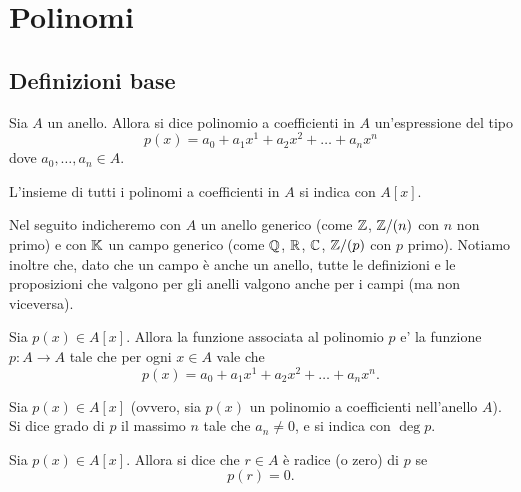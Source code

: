 \chapter{Polinomi}

\section{Definizioni base}

\begin{definition}[Polinomio]
    Sia $A$ un anello. Allora si dice polinomio a coefficienti in $A$ un'espressione del tipo \begin{equation}
        p(x) = a_0 + a_1x^1 + a_2x^2+ \dots + a_nx^n
    \end{equation}
    dove $a_0, \dots, a_n \in A$.

    L'insieme di tutti i polinomi a coefficienti in $A$ si indica con $A[x]$.
\end{definition}

Nel seguito indicheremo con $A$ un anello generico (come $\mathbb{Z}$, $\mathbb{Z}/(n)$ con $n$ non primo) e con $\mathbb{K}$ un campo generico (come $\mathbb{Q}$, $\mathbb{R}$, $\mathbb{C}$, $\mathbb{Z}/(p)$ con $p$ primo). Notiamo inoltre che, dato che un campo è anche un anello, tutte le definizioni e le proposizioni che valgono per gli anelli valgono anche per i campi (ma non viceversa).

\begin{definition}
    Sia $p(x) \in A[x]$. Allora la funzione associata al polinomio $p$ e' la funzione $p : A \to A$ tale che per ogni $x \in A$ vale che \[
        p(x) = a_0 + a_1x^1 + a_2x^2+ \dots + a_nx^n. 
    \]
\end{definition}

\begin{definition}
    Sia $p(x) \in A[x]$ (ovvero, sia $p(x)$ un polinomio a coefficienti nell'anello $A$). Si dice grado di $p$ il massimo $n$ tale che $a_n \neq 0$, e si indica con $\deg p$.
\end{definition}

\begin{definition}
    Sia $p(x) \in A[x]$. Allora si dice che $r \in A$ è radice (o zero) di $p$ se \begin{equation}
        p(r) = 0.
    \end{equation}
\end{definition}

